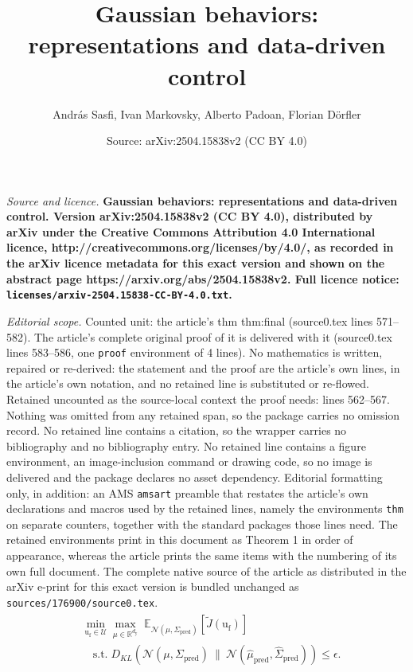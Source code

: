 \documentclass[10pt,a4paper]{amsart}
\title{\LARGE \bf Gaussian behaviors: representations and data-driven control}
\author{Andr\'as Sasfi, Ivan Markovsky, Alberto Padoan, Florian D\"orfler}
\date{Source: arXiv:2504.15838v2 (CC BY 4.0)}
\def\Sp{\Sigma_\mathrm{pred}}
\def\Sph{\hat{\Sigma}_\mathrm{pred}}
\def\dy{d_\mathrm{y}}
\def\mph{\hat{\mu}_\mathrm{pred}}
\def\ufr{\mathrm{u}_\mathrm{f}}
\begin{document}
\maketitle

\noindent\emph{Source and licence.} \LARGE \bf Gaussian behaviors: representations and data-driven control. Version arXiv:2504.15838v2 (CC BY 4.0), distributed by arXiv under the Creative Commons Attribution 4.0 International licence, http://creativecommons.org/licenses/by/4.0/, as recorded in the arXiv licence metadata for this exact version and shown on the abstract page https://arxiv.org/abs/2504.15838v2. Full licence notice: \texttt{licenses/arxiv-2504.15838-CC-BY-4.0.txt}.\par\smallskip

\noindent\textit{Editorial scope.} Counted unit: the article's thm thm:final (source0.tex lines 571--582). The article's complete original proof of it is delivered with it (source0.tex lines 583--586, one \texttt{proof} environment of 4 lines). No mathematics is written, repaired or re-derived: the statement and the proof are the article's own lines, in the article's own notation, and no retained line is substituted or re-flowed.  Retained uncounted as the source-local context the proof needs: lines 562--567.  Nothing was omitted from any retained span, so the package carries no omission record.  No retained line contains a citation, so the wrapper carries no bibliography and no bibliography entry.  No retained line contains a figure environment, an image-inclusion command or drawing code, so no image is delivered and the package declares no asset dependency.  Editorial formatting only, in addition: an AMS \texttt{amsart} preamble that restates the article's own declarations and macros used by the retained lines, namely the environments \texttt{thm} on separate counters, together with the standard packages those lines need.  The retained environments print in this document as Theorem 1 in order of appearance, whereas the article prints the same items with the numbering of its own full document.  The complete native source of the article as distributed in the arXiv e-print for this exact version is bundled unchanged as \texttt{sources/176900/source0.tex}.
\begin{align} \label{eq:min-max-constrained}
    \begin{split}
    & \min_{\ufr \in \mathcal{U}} \max_{\mu\in\mathbb{R}^{\dy}} \;  \mathbb{E}_{\mathcal{N}(\mu,\Sp)}[\tilde{J}(\ufr)] \\
    & \quad  \mathrm{s.t.} \; D_{KL}\left(\mathcal{N}(\mu,\Sp)~\big\|~\mathcal{N}\left(\mph,\Sph\right) \right) \leq \epsilon.
    \end{split}
\end{align}
\end{document}
